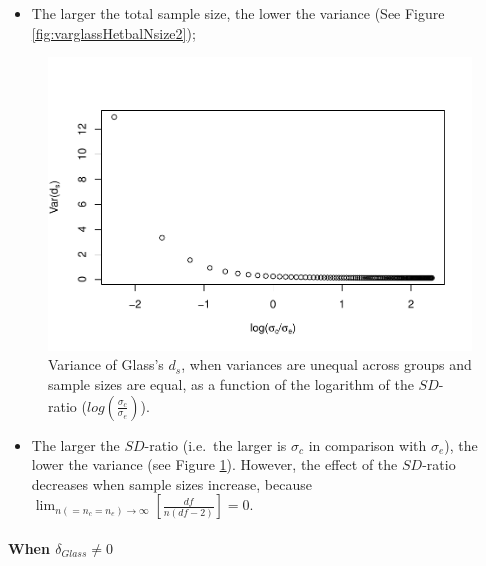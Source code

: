 \documentclass[
  man]{apa6}
\providecommand{\tightlist}{%
  \setlength{\itemsep}{0pt}\setlength{\parskip}{0pt}}
\begin{document}
\begin{itemize}
\tightlist
\item
  The larger the total sample size, the lower the variance (See Figure \ref{fig:varglassHetbalNsize2});
\end{itemize}

\begin{figure}
\centering
\includegraphics{Theoretical-Variance-of-all-estimators-as-a-function-of-population-parameters_files/figure-latex/varglasshetbalSDratio2-1.pdf}
\caption{\label{fig:varglasshetbalSDratio2}Variance of Glass's \(d_s\), when variances are unequal across groups and sample sizes are equal, as a function of the logarithm of the \(SD\)-ratio (\(log \left( \frac{\sigma_c}{\sigma_e} \right)\)).}
\end{figure}

\begin{itemize}
\tightlist
\item
  The larger the \(SD\)-ratio (i.e.~the larger is \(\sigma_c\) in comparison with \(\sigma_e\)), the lower the variance (see Figure \ref{fig:varglasshetbalSDratio2}). However, the effect of the \(SD\)-ratio decreases when sample sizes increase, because \(\lim_{n(=n_c=n_e)\rightarrow \infty}\left[\frac{df}{n(df-2)} \right]=0\).
\end{itemize}

\hypertarget{when-delta_glass-neq-0-1}{%
\paragraph{\texorpdfstring{When \(\delta_{Glass} \neq 0\)}{When \textbackslash delta\_\{Glass\} \textbackslash neq 0}}\label{when-delta_glass-neq-0-1}}
\end{document}

